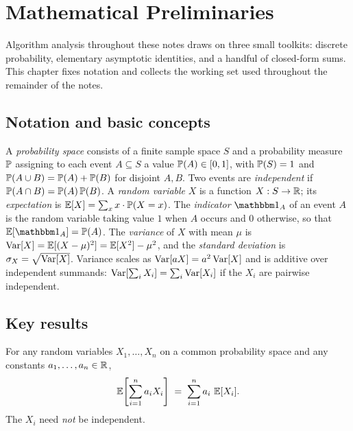 \section{Mathematical Preliminaries}
\label{sec:math}

Algorithm analysis throughout these notes draws on three small toolkits: discrete probability, elementary asymptotic identities, and a handful of closed-form sums. This chapter fixes notation and collects the working set used throughout the remainder of the notes.

\subsection{Notation and basic concepts}

A \emph{probability space} consists of a finite sample space $S$ and a probability measure $\operatorname{\mathbb{P}}$ assigning to each event $A \subseteq S$ a value $\operatorname{\mathbb{P}}(A) \in [0,1]$, with $\operatorname{\mathbb{P}}(S) = 1$ and $\operatorname{\mathbb{P}}(A \cup B) = \operatorname{\mathbb{P}}(A) + \operatorname{\mathbb{P}}(B)$ for disjoint $A, B$. Two events are \emph{independent} if $\operatorname{\mathbb{P}}(A \cap B) = \operatorname{\mathbb{P}}(A)\operatorname{\mathbb{P}}(B)$. A \emph{random variable} $X$ is a function $X : S \to \mathbb{R}$; its \emph{expectation} is $\operatorname{\mathbb{E}}[X] = \sum_x x \cdot \operatorname{\mathbb{P}}(X = x)$. The \emph{indicator} $\indic_A$ of an event $A$ is the random variable taking value $1$ when $A$ occurs and $0$ otherwise, so that $\expec[\indic_A] = \prob(A)$. The \emph{variance} of $X$ with mean $\mu$ is $\operatorname{Var}[X] = \operatorname{\mathbb{E}}[(X-\mu)^2] = \operatorname{\mathbb{E}}[X^2] - \mu^2$, and the \emph{standard deviation} is $\sigma_X = \sqrt{\operatorname{Var}[X]}$. Variance scales as $\operatorname{Var}[aX] = a^2 \operatorname{Var}[X]$ and is additive over independent summands: $\operatorname{Var}[\sum_i X_i] = \sum_i \operatorname{Var}[X_i]$ if the $X_i$ are pairwise independent.

\subsection{Key results}

\begin{theorem}
\label{thm:linearity}
For any random variables $X_1, \dots, X_n$ on a common probability space and any constants $a_1, \dots, a_n \in \mathbb{R}$,
\[
  \operatorname{\mathbb{E}}\!\left[\sum_{i=1}^n a_i X_i\right] \;=\; \sum_{i=1}^n a_i\, \operatorname{\mathbb{E}}[X_i].
\]
The $X_i$ need \emph{not} be independent.
\end{theorem}

